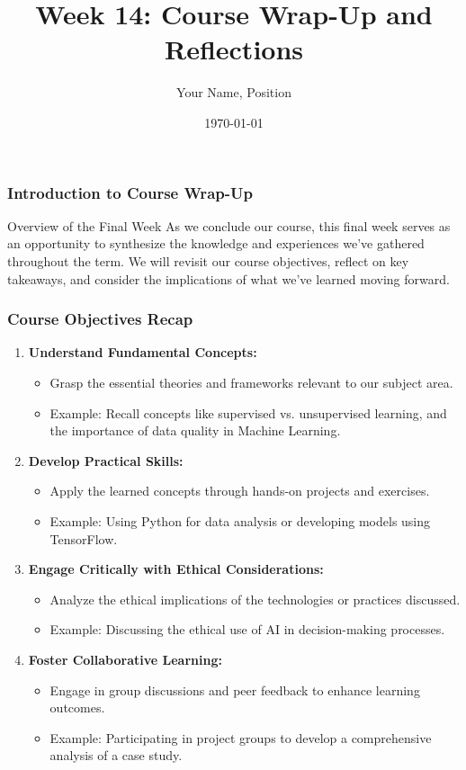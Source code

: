 \documentclass[aspectratio=169]{beamer}
\title[Course Wrap-Up]{Week 14: Course Wrap-Up and Reflections}
\author[Your Name]{Your Name, Position}
\date{\today}
\begin{document}
\frame{\titlepage}

\begin{frame}[fragile]
    \frametitle{Introduction to Course Wrap-Up}
    \begin{block}{Overview of the Final Week}
        As we conclude our course, this final week serves as an opportunity to synthesize the knowledge and experiences we've gathered throughout the term.
        We will revisit our course objectives, reflect on key takeaways, and consider the implications of what we've learned moving forward.
    \end{block}
\end{frame}

\begin{frame}[fragile]
    \frametitle{Course Objectives Recap}
    \begin{enumerate}
        \item \textbf{Understand Fundamental Concepts:}
        \begin{itemize}
            \item Grasp the essential theories and frameworks relevant to our subject area.
            \item Example: Recall concepts like supervised vs. unsupervised learning, and the importance of data quality in Machine Learning.
        \end{itemize}

        \item \textbf{Develop Practical Skills:}
        \begin{itemize}
            \item Apply the learned concepts through hands-on projects and exercises.
            \item Example: Using Python for data analysis or developing models using TensorFlow.
        \end{itemize}

        \item \textbf{Engage Critically with Ethical Considerations:}
        \begin{itemize}
            \item Analyze the ethical implications of the technologies or practices discussed.
            \item Example: Discussing the ethical use of AI in decision-making processes.
        \end{itemize}

        \item \textbf{Foster Collaborative Learning:}
        \begin{itemize}
            \item Engage in group discussions and peer feedback to enhance learning outcomes.
            \item Example: Participating in project groups to develop a comprehensive analysis of a case study.
        \end{itemize}
    \end{enumerate}
\end{frame}
\end{document}
